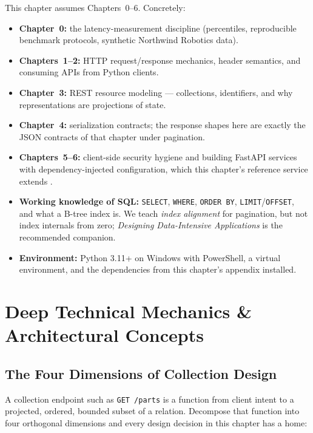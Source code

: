 This chapter assumes Chapters~0--6. Concretely:

\begin{itemize}
  \item \textbf{Chapter~0:} the latency-measurement discipline (percentiles,
        reproducible benchmark protocols, synthetic Northwind Robotics data).
  \item \textbf{Chapters~1--2:} HTTP request/response mechanics, header
        semantics, and consuming APIs from Python clients.
  \item \textbf{Chapter~3:} REST resource modeling --- collections,
        identifiers, and why representations are projections of state.
  \item \textbf{Chapter~4:} serialization contracts; the response shapes here
        are exactly the JSON contracts of that chapter under pagination.
  \item \textbf{Chapters~5--6:} client-side security hygiene and building
        FastAPI services with dependency-injected configuration, which this
        chapter's reference service extends \cite{fastapidocs,pydanticdocs}.
  \item \textbf{Working knowledge of SQL:} \texttt{SELECT}, \texttt{WHERE},
        \texttt{ORDER BY}, \texttt{LIMIT}/\texttt{OFFSET}, and what a B-tree
        index is. We teach \emph{index alignment} for pagination, but not
        index internals from zero; \emph{Designing Data-Intensive
        Applications} \cite{kleppmann2017ddia} is the recommended companion.
  \item \textbf{Environment:} Python 3.11+ on Windows with PowerShell, a
        virtual environment, and the dependencies from this chapter's
        appendix installed.
\end{itemize}

\section{Deep Technical Mechanics \& Architectural Concepts}
\label{sec:ch8-mechanics}

\subsection{The Four Dimensions of Collection Design}
\label{subsec:ch8-four-dimensions}

A collection endpoint such as \texttt{GET /parts} is a function from client
intent to a projected, ordered, bounded subset of a relation. Decompose that
function into four orthogonal dimensions and every design decision in this
chapter has a home:

